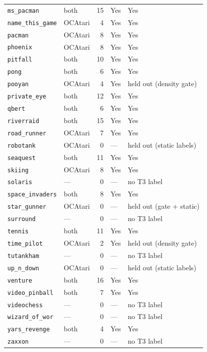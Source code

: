 \begin{longtable}{@{}p{3.2cm}p{1.6cm}r p{1.7cm}p{4.2cm}@{}}
\texttt{ms\_pacman} & both & 15 & Yes & Yes \\
\texttt{name\_this\_game} & OCAtari & 4 & Yes & Yes \\
\texttt{pacman} & OCAtari & 8 & Yes & Yes \\
\texttt{phoenix} & OCAtari & 8 & Yes & Yes \\
\texttt{pitfall} & both & 10 & Yes & Yes \\
\texttt{pong} & both & 6 & Yes & Yes \\
\texttt{pooyan} & OCAtari & 4 & Yes & held out (density gate) \\
\texttt{private\_eye} & both & 12 & Yes & Yes \\
\texttt{qbert} & both & 6 & Yes & Yes \\
\texttt{riverraid} & both & 15 & Yes & Yes \\
\texttt{road\_runner} & OCAtari & 7 & Yes & Yes \\
\texttt{robotank} & OCAtari & 0 & --- & held out (static labels) \\
\texttt{seaquest} & both & 11 & Yes & Yes \\
\texttt{skiing} & OCAtari & 8 & Yes & Yes \\
\texttt{solaris} & --- & 0 & --- & no T3 label \\
\texttt{space\_invaders} & both & 8 & Yes & Yes \\
\texttt{star\_gunner} & OCAtari & 0 & --- & held out (gate + static) \\
\texttt{surround} & --- & 0 & --- & no T3 label \\
\texttt{tennis} & both & 11 & Yes & Yes \\
\texttt{time\_pilot} & OCAtari & 2 & Yes & held out (density gate) \\
\texttt{tutankham} & --- & 0 & --- & no T3 label \\
\texttt{up\_n\_down} & OCAtari & 0 & --- & held out (static labels) \\
\texttt{venture} & both & 16 & Yes & Yes \\
\texttt{video\_pinball} & both & 7 & Yes & Yes \\
\texttt{videochess} & --- & 0 & --- & no T3 label \\
\texttt{wizard\_of\_wor} & --- & 0 & --- & no T3 label \\
\texttt{yars\_revenge} & both & 4 & Yes & Yes \\
\texttt{zaxxon} & --- & 0 & --- & no T3 label \\
\end{longtable}
\normalsize
